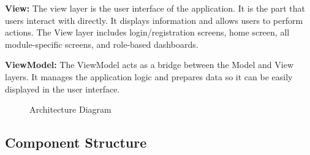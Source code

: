 \documentclass[12pt, a4paper, oneside]{report}
\begin{document}
\textbf{View:} The view layer is the user interface of the application. It is the part that users interact with directly. It displays information and allows users to perform actions. The View layer includes login/registration screens, home screen, all module-specific screens, and role-based dashboards.

\textbf{ViewModel:} The ViewModel acts as a bridge between the Model and View layers. It manages the application logic and prepares data so it can be easily displayed in the user interface.

\begin{figure}[H]
\centering
\caption{Architecture Diagram}
\label{fig:architecture}
\end{figure}

\subsection{Component Structure}
\end{document}
